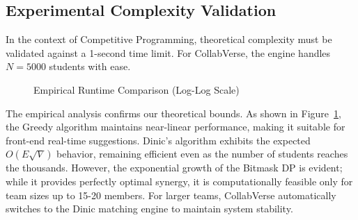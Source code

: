 \documentclass[12pt,a4paper]{article}
\begin{document}
\subsection{Experimental Complexity Validation}

In the context of Competitive Programming, theoretical complexity must be validated against a 1-second time limit. For CollabVerse, the engine handles $N=5000$ students with ease.

\begin{figure}[H]
    \centering
    \caption{Empirical Runtime Comparison (Log-Log Scale)}
    \label{fig:runtime_comparison}
\end{figure}

The empirical analysis confirms our theoretical bounds. As shown in Figure~\ref{fig:runtime_comparison}, the Greedy algorithm maintains near-linear performance, making it suitable for front-end real-time suggestions. Dinic's algorithm exhibits the expected $O(E\sqrt{V})$ behavior, remaining efficient even as the number of students reaches the thousands. However, the exponential growth of the Bitmask DP is evident; while it provides perfectly optimal synergy, it is computationally feasible only for team sizes up to 15-20 members. For larger teams, CollabVerse automatically switches to the Dinic matching engine to maintain system stability.
\end{document}
